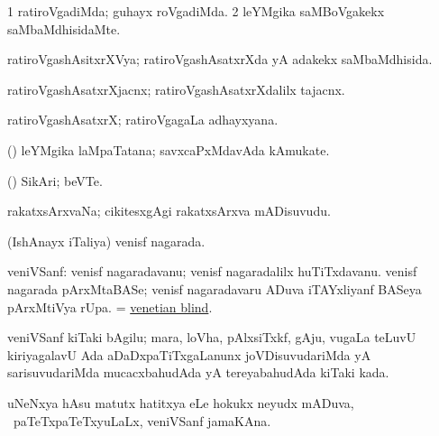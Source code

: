 \bentry
{} 
\gl{\kirxvi}
\expl{}
\bmng
\bnum
\num{1} ratiroVgadiMda; guhayx roVgadiMda. 
\num{2} leYMgika saMBoVgakekx saMbaMdhisidaMte. 
\enum
\emng
\eentry

\bentry
{} 
\gl{\gu}
\expl{}
\bmng
 ratiroVgashAsitxrXVya; ratiroVgashAsatxrXda yA adakekx saMbaMdhisida. 
\emng
\eentry

\bentry
{} 
\gl{\nA}
\expl{}
\bmng
 ratiroVgashAsatxrXjacnx; ratiroVgashAsatxrXdalilx tajacnx. 
\emng
\eentry

\bentry
{} 
\gl{\nA}
\expl{}
\bmng
 ratiroVgashAsatxrX; ratiroVgagaLa adhayxyana. 
\emng
\eentry

\bentry
{} 
\gl{\nA}
\expl{}
\bmng
 (\pArxparx) leYMgika laMpaTatana; savxcaPxMdavAda kAmukate. 
\emng
\eentry

\bentry
{} 
\gl{\nA}
\expl{}
\bmng
 (\pArxparx) SikAri; beVTe. 
\emng
\eentry

\bentry
{} 
\gl{\nA}
\expl{}
\bmng
 rakatxsArxvaNa; cikitesxgAgi rakatxsArxva mADisuvudu. 
\emng
\eentry

\bentry
{} 
\gl{\gu}
\expl{}
\bmng
 (IshAnayx iTaliya) venisf nagarada. 
\emng
\eentry

\bentry
{} 
\gl{\nA}
\expl{}
\bmng
 veniVSanf: 
\banum
{} venisf nagaradavanu; venisf nagaradalilx huTiTxdavanu. 
 venisf nagarada pArxMtaBASe; venisf nagaradavaru ADuva iTAYxliyanf BASeya pArxMtiVya rUpa. 
  = \hyperlink{venetian blind}{venetian blind}. 
\eanum
\emng
\eentry

\bentry
{}
\gl{\nA}
\bmng
 veniVSanf kiTaki bAgilu; mara, loVha, pAlxsiTxkf, gAju, \mo vugaLa teLuvU kiriyagalavU Ada aDaDxpaTiTxgaLanunx joVDisuvudariMda yA sarisuvudariMda mucacxbahudAda yA tereyabahudAda kiTaki kada.  
\emng
\eentry

\bentry
{}
\gl{\nA}
\expl{}
\bmng
 uNeNxya hAsu matutx hatitxya eLe hokukx neyudx mADuva, \sA\ paTeTxpaTeTxyuLaLx, veniVSanf jamaKAna. 
\emng
\eentry


